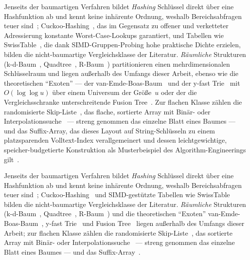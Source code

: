 \begin{nurlang}
Jenseits der baumartigen Verfahren bildet \emph{Hashing} Schlüssel direkt über eine Hashfunktion ab und
kennt keine inhärente Ordnung, weshalb Bereichsabfragen teuer sind~\cite{knuth1998taocp3};
Cuckoo-Hashing~\cite{pagh2004cuckoo}, das im Gegensatz zu offener und verketteter Adressierung konstante
Worst-Case-Lookups garantiert, und Tabellen wie SwissTable~\cite{abseil_swisstable}, die dank
SIMD-Gruppen-Probing hohe praktische Dichte erzielen,
bilden die nicht-baumartige Vergleichsklasse der Literatur\@. \emph{Räumliche} Strukturen
(k-d-Baum~\cite{bentley1975kdtree}, Quadtree~\cite{finkel1974quadtree}, R-Baum~\cite{guttman1984rtree})
partitionieren einen mehrdimensionalen Schlüsselraum und liegen außerhalb des Umfangs dieser Arbeit,
ebenso wie die theoretischen \enquote{Exoten} --- der van-Emde-Boas-Baum~\cite{vanemdeboas1975} und der
y-fast Trie~\cite{willard1983yfast} mit $O(\log\log u)$ über einem Universum der Größe~$u$ oder der die
Vergleichsschranke unterschreitende Fusion Tree~\cite{fredman1993fusion}\@. Zur flachen Klasse zählen die
randomisierte Skip-Liste~\cite{pugh1990skiplist}, das flache, sortierte
Array mit Binär- oder Interpolationssuche~\cite{knuth1998taocp3} --- streng genommen das einzelne Blatt
eines Baumes --- und das Suffix-Array, das dieses Layout auf String-Schlüsseln zu einem platzsparenden
Volltext-Index verallgemeinert und dessen leichtgewichtige, speicher-budgetierte Konstruktion als
Musterbeispiel des Algorithm-Engineerings gilt~\cite{manzini2002suffixarray}.
\end{nurlang}
\begin{nurkurz}
Jenseits der baumartigen Verfahren bildet \emph{Hashing} Schlüssel direkt über eine Hashfunktion ab und kennt
keine inhärente Ordnung, weshalb Bereichsabfragen teuer sind~\cite{knuth1998taocp3}; Cuckoo-Hashing~\cite{pagh2004cuckoo}
und SIMD-gestützte Tabellen wie SwissTable~\cite{abseil_swisstable} bilden die nicht-baumartige Vergleichsklasse der
Literatur\@. \emph{Räumliche} Strukturen (k-d-Baum~\cite{bentley1975kdtree}, Quadtree~\cite{finkel1974quadtree},
R-Baum~\cite{guttman1984rtree}) und die theoretischen \enquote{Exoten} van-Emde-Boas-Baum~\cite{vanemdeboas1975},
y-fast Trie~\cite{willard1983yfast} und Fusion Tree~\cite{fredman1993fusion} liegen außerhalb des Umfangs dieser
Arbeit; zur flachen Klasse zählen die randomisierte Skip-Liste~\cite{pugh1990skiplist}, das sortierte Array mit Binär-
oder Interpolationssuche~\cite{knuth1998taocp3} --- streng genommen das einzelne Blatt eines Baumes --- und das
Suffix-Array~\cite{manzini2002suffixarray}.
\end{nurkurz}

